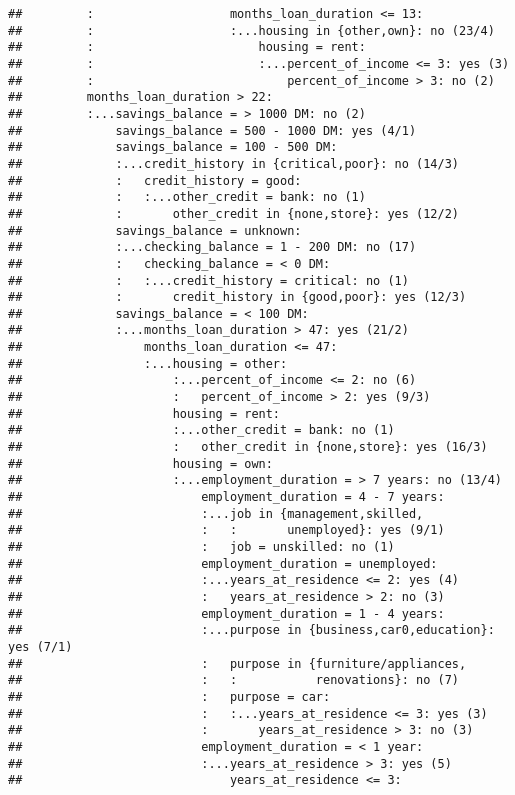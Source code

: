 \documentclass[
]{article}
\begin{document}
\begin{verbatim}
##         :                   months_loan_duration <= 13:
##         :                   :...housing in {other,own}: no (23/4)
##         :                       housing = rent:
##         :                       :...percent_of_income <= 3: yes (3)
##         :                           percent_of_income > 3: no (2)
##         months_loan_duration > 22:
##         :...savings_balance = > 1000 DM: no (2)
##             savings_balance = 500 - 1000 DM: yes (4/1)
##             savings_balance = 100 - 500 DM:
##             :...credit_history in {critical,poor}: no (14/3)
##             :   credit_history = good:
##             :   :...other_credit = bank: no (1)
##             :       other_credit in {none,store}: yes (12/2)
##             savings_balance = unknown:
##             :...checking_balance = 1 - 200 DM: no (17)
##             :   checking_balance = < 0 DM:
##             :   :...credit_history = critical: no (1)
##             :       credit_history in {good,poor}: yes (12/3)
##             savings_balance = < 100 DM:
##             :...months_loan_duration > 47: yes (21/2)
##                 months_loan_duration <= 47:
##                 :...housing = other:
##                     :...percent_of_income <= 2: no (6)
##                     :   percent_of_income > 2: yes (9/3)
##                     housing = rent:
##                     :...other_credit = bank: no (1)
##                     :   other_credit in {none,store}: yes (16/3)
##                     housing = own:
##                     :...employment_duration = > 7 years: no (13/4)
##                         employment_duration = 4 - 7 years:
##                         :...job in {management,skilled,
##                         :   :       unemployed}: yes (9/1)
##                         :   job = unskilled: no (1)
##                         employment_duration = unemployed:
##                         :...years_at_residence <= 2: yes (4)
##                         :   years_at_residence > 2: no (3)
##                         employment_duration = 1 - 4 years:
##                         :...purpose in {business,car0,education}: yes (7/1)
##                         :   purpose in {furniture/appliances,
##                         :   :           renovations}: no (7)
##                         :   purpose = car:
##                         :   :...years_at_residence <= 3: yes (3)
##                         :       years_at_residence > 3: no (3)
##                         employment_duration = < 1 year:
##                         :...years_at_residence > 3: yes (5)
##                             years_at_residence <= 3:

\end{verbatim}
\end{document}
